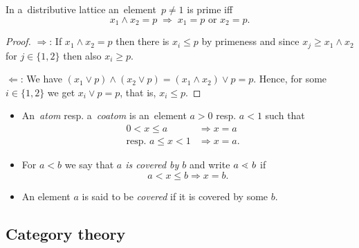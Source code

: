 \begin{lem} \label{lem:primeness-equiv}
  In a~distributive lattice an~element~$p \ne 1$ is prime iff 
  \[
    x_1 \wedge x_2 = p \; \Longrightarrow \; x_1 = p \text{ or } x_2 = p.
  \]
\end{lem}
\begin{proof}
  $\Rightarrow$:
  If $x_1 \wedge x_2 = p$ then there is $x_i \le p$ by primeness and since $x_j
  \ge x_1 \wedge x_2$ for $j\in \{ 1, 2 \}$ then also $x_i \ge p$.

  $\Leftarrow$:
  We have $(x_1 \vee p) \wedge (x_2 \vee p) = (x_1 \wedge x_2) \vee p = p$.
  Hence, for some $i\in \{ 1, 2 \}$ we get $x_i \vee p = p$, that is, $x_i \le
  p$.
\end{proof}

\begin{itemize}
\item An~\emph{atom\/} resp. a~\emph{coatom\/} is an~element $a > 0$ resp. $a <
1$ such that
\begin{align*}
  0 < x \le a &\Rightarrow x = a ~~~~~~\\
  \text{resp. } a \le x < 1 &\Rightarrow x = a.
\end{align*}

\item For $a < b$ we say that \emph{$a$ is covered by $b$\/} and write $a <\mkern-12mu\cdot\mkern8mu
b$ if
\[
  a < x \le b \Rightarrow x = b.
\]

\item An element $a$ is said to be \emph{covered\/} if it is covered by some
$b$.

\end{itemize}

\subsection*{Category theory}

